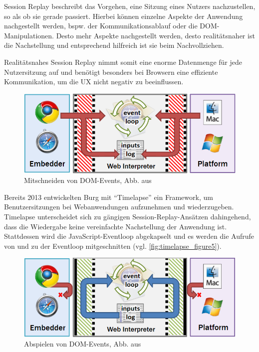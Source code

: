 Session Replay beschreibt das Vorgehen, eine Sitzung eines Nutzers nachzustellen, so als ob sie gerade passiert. Hierbei können einzelne Aspekte der Anwendung nachgestellt werden, bspw. der Kommunikationsablauf oder die DOM-Manipulationen. Desto mehr Aspekte nachgestellt werden, desto realitätsnaher ist die Nachstellung und entsprechend hilfreich ist sie beim Nachvollziehen.

Realitätsnahes Session Replay nimmt somit eine enorme Datenmenge für jede Nutzersitzung auf und benötigt besonders bei Browsern eine effiziente Kommunikation, um die UX nicht negativ zu beeinflussen.

\begin{figure}
\centering
\includegraphics[width=\linewidth]{img/03_methoden/timelapse_figure5.png}
\caption{Mitschneiden von DOM-Events, Abb. aus \cite{TimelapsePaper}}
\label{fig:timelapse_figure5}
\end{figure}

Bereits 2013 entwickelten Burg \etal \cite{TimelapsePaper} mit \enquote{Timelapse} ein Framework, um Benutzersitzungen bei Webanwendungen aufzunehmen und wiederzugeben. Timelapse unterscheidet sich zu gängigen Session-Replay-Ansätzen dahingehend, dass die Wiedergabe keine vereinfachte Nachstellung der Anwendung ist. Stattdessen wird die JavaScript-Eventloop abgekapselt und es werden die Aufrufe von und zu der Eventloop mitgeschnitten (vgl. \autoref{fig:timelapse_figure5}).

\begin{figure}
\centering
\includegraphics[width=\linewidth]{img/03_methoden/timelapse_figure6.png}
\caption{Abspielen von DOM-Events, Abb. aus \cite{TimelapsePaper}}
\label{fig:timelapse_figure6}
\end{figure}

